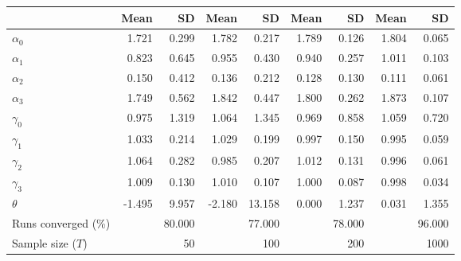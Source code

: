 
\begin{tabular}[t]{lrrrrrrrr}
\toprule
  & Mean & SD & Mean  & SD  & Mean   & SD   & Mean    & SD   \\
\midrule
$\alpha_{0}$ & 1.721 & 0.299 & 1.782 & 0.217 & 1.789 & 0.126 & 1.804 & 0.065\\
$\alpha_{1}$ & 0.823 & 0.645 & 0.955 & 0.430 & 0.940 & 0.257 & 1.011 & 0.103\\
$\alpha_{2}$ & 0.150 & 0.412 & 0.136 & 0.212 & 0.128 & 0.130 & 0.111 & 0.061\\
$\alpha_{3}$ & 1.749 & 0.562 & 1.842 & 0.447 & 1.800 & 0.262 & 1.873 & 0.107\\
$\gamma_{0}$ & 0.975 & 1.319 & 1.064 & 1.345 & 0.969 & 0.858 & 1.059 & 0.720\\
$\gamma_{1}$ & 1.033 & 0.214 & 1.029 & 0.199 & 0.997 & 0.150 & 0.995 & 0.059\\
$\gamma_{2}$ & 1.064 & 0.282 & 0.985 & 0.207 & 1.012 & 0.131 & 0.996 & 0.061\\
$\gamma_{3}$ & 1.009 & 0.130 & 1.010 & 0.107 & 1.000 & 0.087 & 0.998 & 0.034\\
$\theta$ & -1.495 & 9.957 & -2.180 & 13.158 & 0.000 & 1.237 & 0.031 & 1.355\\
Runs converged (\%) &  & 80.000 &  & 77.000 &  & 78.000 &  & 96.000\\
Sample size ($T$) &  & 50 &  & 100 &  & 200 &  & 1000\\
\bottomrule
\end{tabular}

